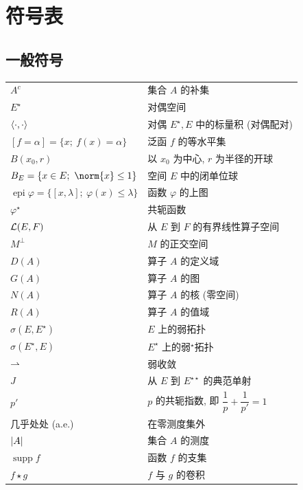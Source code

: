 
\chapter*{符号表}

\section*{一般符号}

\begin{longtable}{@{}p{3.8cm}p{9.5cm}@{}}
$A^c$ & 集合 $A$ 的补集 \\
$E^\star$ & 对偶空间 \\
$\left\langle \cdot,\cdot\right\rangle$ & 对偶 $E^\star,E$ 中的标量积 (对偶配对) \\
$[f=\alpha]=\{x;\ f(x)=\alpha\}$ & 泛函 $f$ 的等水平集 \\
$B(x_0,r)$ & 以 $x_0$ 为中心, $r$ 为半径的开球 \\
$B_E=\{x\in E;\ \norm{x}\le1\}$ & 空间 $E$ 中的闭单位球 \\
$\operatorname{epi}\varphi=\{[x,\lambda];\ \varphi(x)\le\lambda\}$ & 函数 $\varphi$ 的上图 \\
$\varphi^\star$ & 共轭函数 \\
$\mathcal{L}(E,F)$ & 从 $E$ 到 $F$ 的有界线性算子空间 \\
$M^\perp$ & $M$ 的正交空间 \\
$D(A)$ & 算子 $A$ 的定义域 \\
$G(A)$ & 算子 $A$ 的图 \\
$N(A)$ & 算子 $A$ 的核 (零空间) \\
$R(A)$ & 算子 $A$ 的值域 \\
$\sigma(E,E^\star)$ & $E$ 上的弱拓扑 \\
$\sigma(E^\star,E)$ & $E^\star$ 上的弱$^\star$拓扑 \\
$\rightharpoonup$ & 弱收敛 \\
$J$ & 从 $E$ 到 $E^{\star\star}$ 的典范单射 \\
$p'$ & $p$ 的共轭指数, 即 $\dfrac{1}{p}+\dfrac{1}{p'}=1$ \\
几乎处处 (a.e.) & 在零测度集外 \\
$\left|A\right|$ & 集合 $A$ 的测度 \\
$\operatorname{supp}f$ & 函数 $f$ 的支集 \\
$f\star g$ & $f$ 与 $g$ 的卷积 \\

\end{longtable}
